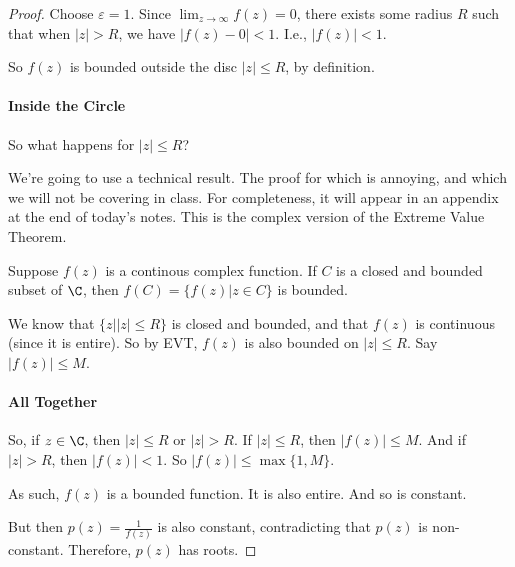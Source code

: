 \begin{proof}
Choose $\varepsilon = 1$. Since $\lim_{z\rightarrow \infty} f(z) = 0$, there exists some radius $R$ such that when $|z| > R$, we have $|f(z) - 0| < 1$. I.e., $|f(z)| < 1$.

So $f(z)$ is bounded outside the disc $|z| \le R$, by definition.

\paragraph{Inside the Circle} So what happens for $|z| \le R$? 

We're going to use a technical result. The proof for which is annoying, and which we will not be covering in class. For completeness, it will appear in an appendix at the end of today's notes. This is the complex version of the Extreme Value Theorem.

\begin{lem} Suppose $f(z)$ is a continous complex function. If $C$ is a closed and bounded subset of $\C$, then $f(C) = \{f(z)|z\in C\}$ is bounded.\end{lem}

We know that $\{z||z|\le R\}$ is closed and bounded, and that $f(z)$ is continuous (since it is entire). So by EVT, $f(z)$ is also bounded on $|z| \le R$. Say $|f(z)| \le M$.

\paragraph{All Together} So, if $z\in \C$, then $|z| \le R$ or $|z| > R$. If $|z| \le R$, then $|f(z)| \le M$. And if $|z| > R$, then $|f(z)| < 1$. So $|f(z)| \le \max\{1,M\}$.

As such, $f(z)$ is a bounded function. It is also entire. And so is constant.

But then $p(z) = \frac{1}{f(z)}$ is also constant, contradicting that $p(z)$ is non-constant. Therefore, $p(z)$ has roots.

\end{proof}


